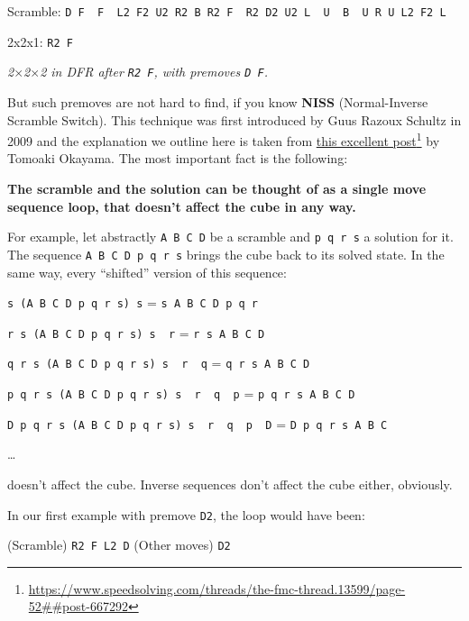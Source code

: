\documentclass[11pt,a4paper]{book}
\newcommand{\p}{\textquotesingle}
\newcommand{\m}{\texttt}
\newcommand{\ps}{\p\,\,}
\begin{document}
\begin{center}
Scramble: \m{D F\ps F\ps L2 F2 U2 R2 B R2 F\ps R2 D2 U2 L\ps U\ps B\ps U R U L2 F2 L\p}

2x2x1: \m{R2 F}



\emph{2$\times$2$\times$2 in DFR after \m{R2 F}, with premoves \m{D F\p}.}
\end{center}

But such premoves are not hard to find, if you know \textbf{NISS} (Normal-Inverse Scramble Switch). This technique was first introduced by Guus Razoux Schultz in 2009 and the explanation we outline here is taken from \href{https://www.speedsolving.com/threads/the-fmc-thread.13599/page-52##post-667292}{this excellent post}\footnote{\url{https://www.speedsolving.com/threads/the-fmc-thread.13599/page-52##post-667292}} by Tomoaki Okayama. The most important fact is the following:

\begin{framed}
\textbf{The scramble and the solution can be thought of as a single move sequence loop, that doesn't affect the cube in any way.}
\end{framed}

For example, let abstractly \m{A B C D} be a scramble and \m{p q r s} a solution for it. The sequence \m{A B C D p q r s} brings the cube back to its solved state. In the same way, every ``shifted'' version of this sequence:

\begin{center}
\m{s (A B C D p q r s) s\p} = \m{s A B C D p q r}

\m{r s (A B C D p q r s) s\ps r\p} = \m{r s A B C D}

\m{q r s (A B C D p q r s) s\ps r\ps q\p} = \m{q r s A B C D}

\m{p q r s (A B C D p q r s) s\ps r\ps q\ps p\p} = \m{p q r s A B C D}

\m{D p q r s (A B C D p q r s) s\ps r\ps q\ps p\ps D\p} = \m{D p q r s A B C}

\dots
\end{center}

doesn't affect the cube. Inverse sequences don't affect the cube either, obviously.

In our first example with premove \m{D2}, the loop would have been:

\begin{center}
(Scramble) \m{R2 F L2 D\p} (Other moves) \m{D2}
\end{center}
\end{document}
